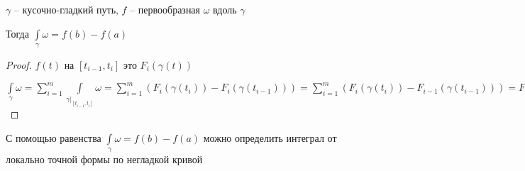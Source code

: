 \begin{consequence}\thmslashn
	
	$\gamma$ -- кусочно-гладкий путь, $f$ -- первообразная $\omega$ вдоль $\gamma$
	
	Тогда $\int\limits_{\gamma} \omega = f(b) - f(a)$
	
\end{consequence}

\begin{proof}\thmslashn
	
	$f(t)$ на $[t_{i-1}, t_i]$ это $F_i(\gamma(t))$
	
	$\int\limits_{\gamma} \omega = \sum\limits_{i = 1}^m \int\limits_{\gamma|_{[t_{i-1}, t_i]}} \omega = \sum\limits_{i = 1}^m (F_i(\gamma(t_i)) - F_i(\gamma(t_{i-1}))) = \sum\limits_{i = 1}^m (F_i(\gamma(t_i)) - F_{i-1}(\gamma(t_{i-1}))) = F_m(\gamma(b)) - F_1(\gamma(a)) = f(b) - f(a)$
	
\end{proof}

\begin{remark}\thmslashn

	С помощью равенства $\int\limits_{\gamma} \omega = f(b) - f(a)$  можно определить интеграл от локально точной формы по негладкой кривой

\end{remark}

